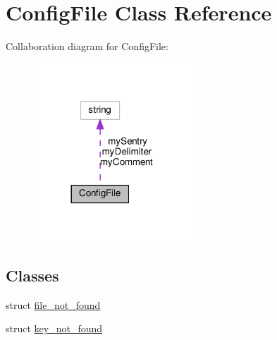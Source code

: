 \hypertarget{class_config_file}{}\section{Config\+File Class Reference}
\label{class_config_file}


Collaboration diagram for Config\+File\+:\nopagebreak
\begin{figure}[H]
\begin{center}
\leavevmode
\includegraphics[width=168pt]{class_config_file__coll__graph}
\end{center}
\end{figure}
\subsection*{Classes}
\begin{DoxyCompactItemize}
\item 
struct \hyperlink{struct_config_file_1_1file__not__found}{file\+\_\+not\+\_\+found}
\item 
struct \hyperlink{struct_config_file_1_1key__not__found}{key\+\_\+not\+\_\+found}
\end{DoxyCompactItemize}
